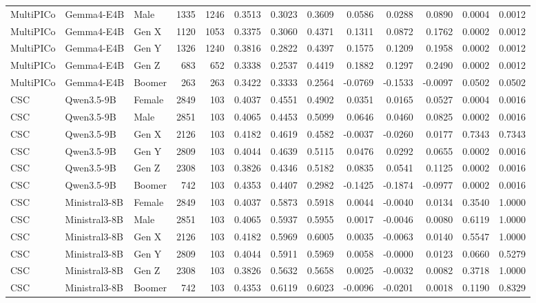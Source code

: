 \begin{longtable}{lllrrrrrrrrrr}
MultiPICo & Gemma4-E4B & Male & 1335 & 1246 & 0.3513 & 0.3023 & 0.3609 & 0.0586 & 0.0288 & 0.0890 & 0.0004 & 0.0012 \\
MultiPICo & Gemma4-E4B & Gen X & 1120 & 1053 & 0.3375 & 0.3060 & 0.4371 & 0.1311 & 0.0872 & 0.1762 & 0.0002 & 0.0012 \\
MultiPICo & Gemma4-E4B & Gen Y & 1326 & 1240 & 0.3816 & 0.2822 & 0.4397 & 0.1575 & 0.1209 & 0.1958 & 0.0002 & 0.0012 \\
MultiPICo & Gemma4-E4B & Gen Z & 683 & 652 & 0.3338 & 0.2537 & 0.4419 & 0.1882 & 0.1297 & 0.2490 & 0.0002 & 0.0012 \\
MultiPICo & Gemma4-E4B & Boomer & 263 & 263 & 0.3422 & 0.3333 & 0.2564 & -0.0769 & -0.1533 & -0.0097 & 0.0502 & 0.0502 \\
CSC & Qwen3.5-9B & Female & 2849 & 103 & 0.4037 & 0.4551 & 0.4902 & 0.0351 & 0.0165 & 0.0527 & 0.0004 & 0.0016 \\
CSC & Qwen3.5-9B & Male & 2851 & 103 & 0.4065 & 0.4453 & 0.5099 & 0.0646 & 0.0460 & 0.0825 & 0.0002 & 0.0016 \\
CSC & Qwen3.5-9B & Gen X & 2126 & 103 & 0.4182 & 0.4619 & 0.4582 & -0.0037 & -0.0260 & 0.0177 & 0.7343 & 0.7343 \\
CSC & Qwen3.5-9B & Gen Y & 2809 & 103 & 0.4044 & 0.4639 & 0.5115 & 0.0476 & 0.0292 & 0.0655 & 0.0002 & 0.0016 \\
CSC & Qwen3.5-9B & Gen Z & 2308 & 103 & 0.3826 & 0.4346 & 0.5182 & 0.0835 & 0.0541 & 0.1125 & 0.0002 & 0.0016 \\
CSC & Qwen3.5-9B & Boomer & 742 & 103 & 0.4353 & 0.4407 & 0.2982 & -0.1425 & -0.1874 & -0.0977 & 0.0002 & 0.0016 \\
CSC & Ministral3-8B & Female & 2849 & 103 & 0.4037 & 0.5873 & 0.5918 & 0.0044 & -0.0040 & 0.0134 & 0.3540 & 1.0000 \\
CSC & Ministral3-8B & Male & 2851 & 103 & 0.4065 & 0.5937 & 0.5955 & 0.0017 & -0.0046 & 0.0080 & 0.6119 & 1.0000 \\
CSC & Ministral3-8B & Gen X & 2126 & 103 & 0.4182 & 0.5969 & 0.6005 & 0.0035 & -0.0063 & 0.0140 & 0.5547 & 1.0000 \\
CSC & Ministral3-8B & Gen Y & 2809 & 103 & 0.4044 & 0.5911 & 0.5969 & 0.0058 & -0.0000 & 0.0123 & 0.0660 & 0.5279 \\
CSC & Ministral3-8B & Gen Z & 2308 & 103 & 0.3826 & 0.5632 & 0.5658 & 0.0025 & -0.0032 & 0.0082 & 0.3718 & 1.0000 \\
CSC & Ministral3-8B & Boomer & 742 & 103 & 0.4353 & 0.6119 & 0.6023 & -0.0096 & -0.0201 & 0.0018 & 0.1190 & 0.8329 \\

\end{longtable}
